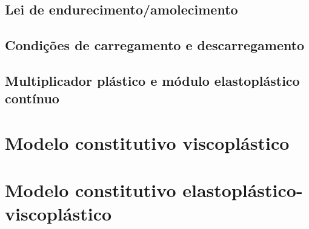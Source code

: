 \subsection{Lei de endurecimento/amolecimento}

\subsection{Condições de carregamento e descarregamento}

\subsection{Multiplicador plástico e módulo elastoplástico contínuo}

\section{Modelo constitutivo viscoplástico}


\section{Modelo constitutivo elastoplástico-viscoplástico}







